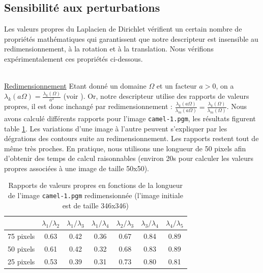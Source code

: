 \documentclass[a4paper,10pt]{article} %
\theoremstyle{definition} %
\begin{document}

  \subsection{Sensibilité aux perturbations}

Les valeurs propres du Laplacien de Dirichlet vérifient un certain nombre de propriétés mathématiques qui garantissent que notre descripteur est insensible au redimensionnement, à la rotation et à la translation. Nous vérifions expérimentalement ces propriétés ci-dessous.

~\\
\underline{Redimensionnement} Etant donné un domaine $\Omega$ et un facteur $a > 0$, on a $\lambda_k(a \Omega) = \frac{\lambda_k(\Omega)}{a^2}$ (voir \cite{KhabouHR07}). Or, notre descripteur utilise des rapports de valeurs propres, il est donc inchangé par redimensionnement : $\frac{\lambda_k(a \Omega)}{\lambda_m(a \Omega)} = \frac{\lambda_k(\Omega)}{\lambda_m(\Omega)}$. Nous avons calculé différents rapports pour l'image \texttt{camel-1.pgm}, les résultats figurent table \ref{scale}. Les variations d'une image à l'autre peuvent s'expliquer par les dégrations des contours suite au redimensionnement. Les rapports restent tout de même très proches. En pratique, nous utilisons une longueur de 50 pixels afin d'obtenir des temps de calcul raisonnables (environ 20s pour calculer les valeurs propres associées à une image de taille 50x50).

\begin{table}[H]
  \begin{center}
    \begin{tabular}{l | c c c c c c}
                & $\lambda_1 / \lambda_2$ & $\lambda_1 / \lambda_3$ & $\lambda_1 / \lambda_4$ & $\lambda_2 / \lambda_3$ & $\lambda_3 / \lambda_4$ & $\lambda_4 / \lambda_5$ \\ \hline
      75 pixels & 0.63 & 0.42 & 0.36 & 0.67 & 0.84 & 0.89 \\
      50 pixels & 0.61 & 0.42 & 0.32 & 0.68 & 0.83 & 0.89 \\
      25 pixels & 0.53 & 0.39 & 0.31 & 0.73 & 0.80 & 0.81
    \end{tabular}
  \end{center}
\caption{Rapports de valeurs propres en fonctions de la longueur de l'image \texttt{camel-1.pgm} redimensionnée (l'image initiale est de taille 346x346)}
\label{scale}
\end{table}
\end{document}

